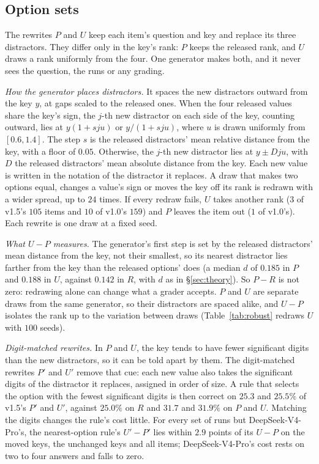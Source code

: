 \documentclass{article}
\begin{document}
\subsection{Option sets}
\label{app:options}

The rewrites $P$ and $U$ keep each item's question and key and replace its three distractors. They differ only in
the key's rank: $P$ keeps the released rank, and $U$ draws a rank uniformly from the four. One generator makes both,
and it never sees the question, the runs or any grading.

\emph{How the generator places distractors.} It spaces the new distractors outward from the key $y$, at gaps scaled
to the released ones. When the four released values share the key's sign, the $j$-th new distractor on each side of
the key, counting outward, lies at $y(1+sju)$ or $y/(1+sju)$, where $u$ is drawn uniformly from $[0.6,1.4]$. The step
$s$ is the released distractors' mean relative distance from the key, with a floor of $0.05$. Otherwise, the
$j$-th new distractor lies at $y\pm Dju$, with $D$ the released distractors' mean absolute distance from the key. Each new value is written in the notation of the distractor it
replaces. A draw that makes two options equal, changes a value's sign or moves the key off its rank is redrawn with a
wider spread, up to $24$ times. If every redraw fails, $U$ takes another rank ($3$ of v1.5's $105$ items and $10$ of
v1.0's $159$) and $P$ leaves the item out ($1$ of v1.0's). Each rewrite is one draw at a fixed seed.

\emph{What $U-P$ measures.} The generator's first step is set by the released distractors' mean distance from the
key, not their smallest, so its nearest distractor lies farther from the key than the released options' does (a median $d$ of $0.185$ in $P$ and $0.188$ in $U$, against $0.142$ in $R$, with $d$ as in
\S\ref{sec:theory}). So $P-R$ is not zero: redrawing alone can change what a grader accepts. $P$ and $U$ are separate draws from the same generator, so their distractors are
spaced alike, and $U-P$ isolates the rank up to the variation between draws (Table~\ref{tab:robust} redraws $U$ with
$100$ seeds).

\emph{Digit-matched rewrites.} In $P$ and $U$, the key tends to have fewer significant digits than the new distractors,
so it can be told apart by them. The digit-matched rewrites $P'$ and $U'$ remove that cue: each new value also takes the significant digits
of the distractor it replaces, assigned in order of size. A rule that selects the option with the fewest significant
digits is then correct on $25.3$ and $25.5\%$ of v1.5's $P'$ and $U'$, against $25.0\%$ on $R$ and $31.7$ and $31.9\%$
on $P$ and $U$. Matching the digits changes the rule's cost little. For every set of runs but DeepSeek-V4-Pro's, the
nearest-option rule's $U'-P'$ lies within $2.9$ points of its $U-P$ on the moved keys, the unchanged keys and all
items; DeepSeek-V4-Pro's cost rests on two to four answers and falls to zero.
\end{document}
